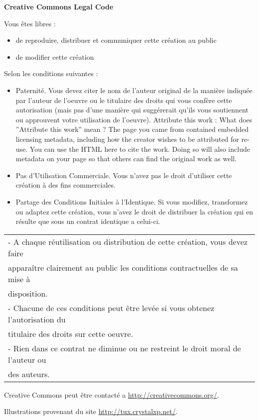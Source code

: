 \begin{center} \textbf{Creative Commons Legal Code} \end{center}
Vous êtes libres :
\begin{itemize}
\item de reproduire, distribuer et communiquer cette création au public
\item de modifier cette création
\end{itemize}
\vspace{1cm}
Selon les conditions suivantes :
\begin{itemize}
\item Paternité. Vous devez citer le nom de l’auteur original de la manière indiquée par l’auteur de l’oeuvre ou le titulaire des
   droits qui vous confère cette autorisation (mais pas d’une manière qui suggérerait qu’ils vous soutiennent ou approuvent
   votre utilisation de l’oeuvre). Attribute this work : What does ”Attribute this work” mean ? The page you came from
   contained embedded licensing metadata, including how the creator wishes to be attributed for re-use. You can use the
   HTML here to cite the work. Doing so will also include metadata on your page so that others can find the original work
   as well.
\item Pas d’Utilisation Commerciale. Vous n’avez pas le droit d’utiliser cette création à des fins commerciales.
\item Partage des Conditions Initiales à l’Identique. Si vous modifiez, transformez ou adaptez cette création, vous n’avez le
droit de distribuer la création qui en résulte que sous un contrat identique a celui-ci.
\end{itemize}

\vspace{1cm}
\begin{tabular}{|l|}
\hline
- A chaque réutilisation ou distribution de cette création, vous devez faire\\
apparaître clairement au public les conditions contractuelles de sa mise à\\
disposition.\\
- Chacune de ces conditions peut être levée si vous obtenez l’autorisation du\\
titulaire des droits sur cette oeuvre.\\
- Rien dans ce contrat ne diminue ou ne restreint le droit moral de l’auteur ou\\
des auteurs.\\
\hline
\end{tabular}
\vspace{1cm}

Creative Commons peut être contacté a \url{http://creativecommons.org/}.

Illustrations provenant du site \url{http://tux.crystalxp.net/}.
